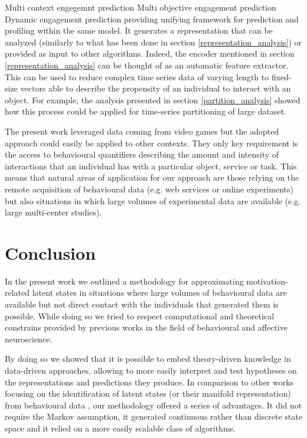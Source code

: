 Multi context engegemnt prediction
Multi objective engagement prediction
Dynamic engagement prediction
providing unifying framework for prediction and profiling within the same model.
It generates a representation that can be analyzed (similarly to what has been done in section \ref{representation_analysis}) or provided as input to other algorithms. Indeed, the encoder mentioned in section \ref{representation_analysis} can be thought of as an automatic feature extractor. This can be used to reduce complex time series data of varying length to fixed-size vectors able to describe the propensity of an individual to interact with an object. For example, the analysis presented in section \ref{partition_analysis} showed how this process could be applied for time-series partitioning of large dataset.

The present work leveraged data coming from video games but the adopted approach could easily be applied to other contexts. They only key requirement is the access to behavioural quantifiers describing the amount and intensity of interactions that an individual has with a particular object, service or task. This means that natural areas of application for our approach are those relying on the remote acquisition of behavioural data (e.g. web services or online experiments) but also situations in which large volumes of experimental data are available (e.g. large multi-center studies). 

\section{Conclusion}
\label{conclusions}
In the present work we outlined a methodology for approximating motivation-related latent states in situations where large volumes of behavioural data are available but not direct contact with the individuals that generated them is possible. While doing so we tried to respect computational and theoretical constrains provided by previous works in the field of behavioural and affective neuroscience. 

By doing so we showed that it is possible to embed theory-driven knowledge in data-driven approaches, allowing to more easily interpret and test hypotheses on the representations and predictions they produce. In comparison to other works focusing on the identification of latent states (or their manifold representation) from behavioural data \cite{calhoun2019unsupervised, luxem2020identifying, pereira2020quantifying, shi2021learning, mccullough2021unsupervised}, our methodology offered a series of advantages. It did not require the Markov assumption, it generated continuous rather than discrete state space and it relied on a more easily scalable class of algorithms. 

